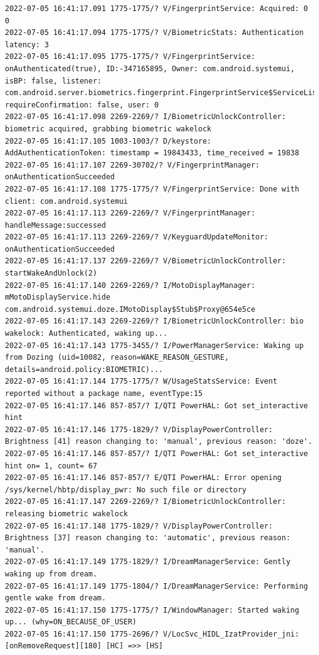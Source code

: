\documentclass[a4paper,12pt]{book}
\begin{document}
\begin{lstlisting}
2022-07-05 16:41:17.091 1775-1775/? V/FingerprintService: Acquired: 0 0
2022-07-05 16:41:17.094 1775-1775/? V/BiometricStats: Authentication latency: 3
2022-07-05 16:41:17.095 1775-1775/? V/FingerprintService: onAuthenticated(true), ID:-347165895, Owner: com.android.systemui, isBP: false, listener: com.android.server.biometrics.fingerprint.FingerprintService$ServiceListenerImpl@e1be90e, requireConfirmation: false, user: 0
2022-07-05 16:41:17.098 2269-2269/? I/BiometricUnlockController: biometric acquired, grabbing biometric wakelock
2022-07-05 16:41:17.105 1003-1003/? D/keystore: AddAuthenticationToken: timestamp = 19843433, time_received = 19838
2022-07-05 16:41:17.107 2269-30702/? V/FingerprintManager: onAuthenticationSucceeded
2022-07-05 16:41:17.108 1775-1775/? V/FingerprintService: Done with client: com.android.systemui
2022-07-05 16:41:17.113 2269-2269/? V/FingerprintManager: handleMessage:successed
2022-07-05 16:41:17.113 2269-2269/? V/KeyguardUpdateMonitor: onAuthenticationSucceeded
2022-07-05 16:41:17.137 2269-2269/? V/BiometricUnlockController: startWakeAndUnlock(2)
2022-07-05 16:41:17.140 2269-2269/? I/MotoDisplayManager: mMotoDisplayService.hide com.android.systemui.doze.IMotoDisplay$Stub$Proxy@654e5ce
2022-07-05 16:41:17.143 2269-2269/? I/BiometricUnlockController: bio wakelock: Authenticated, waking up...
2022-07-05 16:41:17.143 1775-3455/? I/PowerManagerService: Waking up from Dozing (uid=10082, reason=WAKE_REASON_GESTURE, details=android.policy:BIOMETRIC)...
2022-07-05 16:41:17.144 1775-1775/? W/UsageStatsService: Event reported without a package name, eventType:15
2022-07-05 16:41:17.146 857-857/? I/QTI PowerHAL: Got set_interactive hint
2022-07-05 16:41:17.146 1775-1829/? V/DisplayPowerController: Brightness [41] reason changing to: 'manual', previous reason: 'doze'.
2022-07-05 16:41:17.146 857-857/? I/QTI PowerHAL: Got set_interactive hint on= 1, count= 67
2022-07-05 16:41:17.146 857-857/? E/QTI PowerHAL: Error opening /sys/kernel/hbtp/display_pwr: No such file or directory
2022-07-05 16:41:17.147 2269-2269/? I/BiometricUnlockController: releasing biometric wakelock
2022-07-05 16:41:17.148 1775-1829/? V/DisplayPowerController: Brightness [37] reason changing to: 'automatic', previous reason: 'manual'.
2022-07-05 16:41:17.149 1775-1829/? I/DreamManagerService: Gently waking up from dream.
2022-07-05 16:41:17.149 1775-1804/? I/DreamManagerService: Performing gentle wake from dream.
2022-07-05 16:41:17.150 1775-1775/? I/WindowManager: Started waking up... (why=ON_BECAUSE_OF_USER)
2022-07-05 16:41:17.150 1775-2696/? V/LocSvc_HIDL_IzatProvider_jni: [onRemoveRequest][180] [HC] =>> [HS]

\end{lstlisting}
\end{document}
